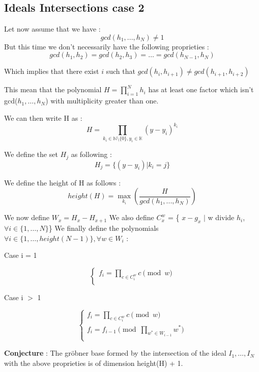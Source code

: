 \documentclass{article}
\begin{document}
\subsection*{Ideals Intersections case 2}

Let now assume that we have : 
\[gcd(h_{1},...,h_{N}) \neq 1\]
But this time we don't necessarily have the following proprieties :
\[gcd(h_{1},h_{2}) = gcd(h_{2},h_{3}) = \dots = gcd(h_{N-1},h_{N}) \]

Which implies that there exist $i$ such that $gcd(h_{i},h_{i+1}) \neq gcd(h_{i+1},h_{i+2})$

This mean that the polynomial $H = \prod_{i=1}^{N} h_{i}$ has at least one factor which isn't gcd($h_{1},\dots,h_{N}$) with multiplicity greater than one.

We can then write H as :
\[H=\prod_{k_{i} \in \mathbb{N}
 \setminus \{0\}, y_{i}\in \mathbb{K}} (y-y_{i})^{k_{i}}\]

We define the set $H_{j}$ as following :
\[H_{j} = \{ (y-y_{i}) | k_{i} = j\}\]

We define the height of H as follows : \[height(H) = \max_{k_{i}}(\frac{H}{gcd(h_{1},...,h_{N})})\]

We now define $W_{x} = H_{x}-H_{x+1}$
We also define $C_{x}^{w}$ = \{ $x-g_{x}$ $|$ w divide $h_{i}$, $\forall i \in \{1,\dots,N\}$\}
We finally define the polynomials $\forall i \in \{1,\dots,height(N-1)\}, \forall w \in W_{i}$ :

Case i = 1

\begin{displaymath}
    \left\{
    \begin{array}{ll}
    f_{i} = \prod_{c \in C_{i}^{w} } c \pmod w \\
    \end{array}
    \right.
\end{displaymath}

Case i $>$ 1

\begin{displaymath}
    \left\{
    \begin{array}{ll}
    f_{i} = \prod_{c \in C_{i}^{w} } c \pmod w \\
    f_{i} = f_{i-1} \pmod{\prod_{w^{*} \in W_{i-1}} w^{*}}\\
    \end{array}
    \right.
\end{displaymath}


\textbf{Conjecture} : The gröbner base formed by the intersection of the ideal $I_{1},\dots,I_{N}$ with the
above proprieties is of dimension height(H) + 1.
\end{document}

